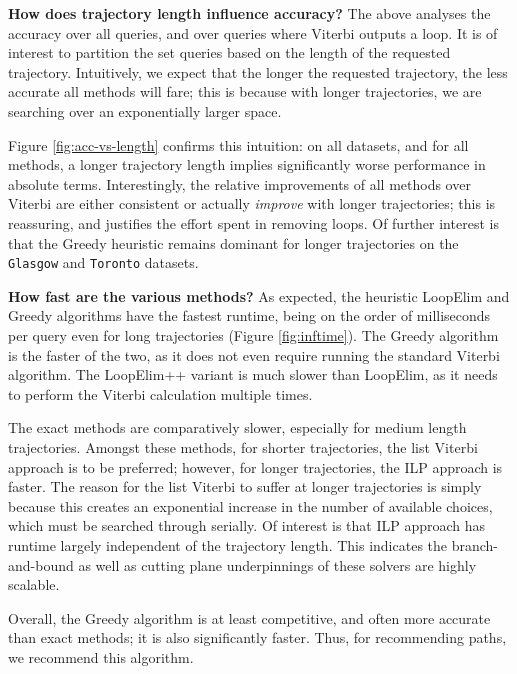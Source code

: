 \textbf{How does trajectory length influence accuracy?}
The above analyses the accuracy over all queries, and over queries where {\sc Viterbi} outputs a loop.
It is of interest to partition the set queries based on the length of the requested trajectory.
Intuitively, we expect that the longer the requested trajectory, the less accurate all methods will fare; this is because with longer trajectories, we are searching over an exponentially larger space.

Figure \ref{fig:acc-vs-length} confirms this intuition:
on all datasets, and for all methods,
a longer trajectory length implies significantly worse performance in absolute terms.
Interestingly, the relative improvements of all methods over {\sc Viterbi} are either consistent or actually \emph{improve} with longer trajectories;
this is reassuring, and justifies the effort spent in removing loops.
Of further interest is that the {\sc Greedy} heuristic remains dominant for longer trajectories on the {\tt Glasgow} and {\tt Toronto} datasets.


\textbf{How fast are the various methods?}
As expected, the heuristic {\sc LoopElim} and {\sc Greedy} algorithms have the fastest runtime, being on the order of milliseconds per query even for long trajectories (Figure \ref{fig:inftime}).
The {\sc Greedy} algorithm is the faster of the two, as it does not even require running the standard Viterbi algorithm.
The {\sc LoopElim++} variant is much slower than {\sc LoopElim}, as it needs to perform the Viterbi calculation multiple times.

The exact methods are comparatively slower, especially for medium length trajectories.
Amongst these methods, for shorter trajectories, the list Viterbi approach is to be preferred;
however, for longer trajectories, the ILP approach is faster.
The reason for the list Viterbi to suffer at longer trajectories is simply because this creates an exponential increase in the number of available choices, which must be searched through serially.
Of interest is that ILP approach has runtime largely independent of the trajectory length.
This indicates the branch-and-bound as well as cutting plane underpinnings of these solvers are highly scalable.

Overall, the {\sc Greedy} algorithm is at least competitive, and often more accurate than exact methods;
it is also significantly faster.
Thus, for recommending paths, we recommend this algorithm.


